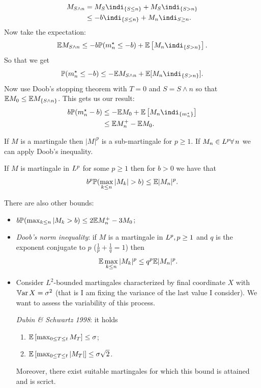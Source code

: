 \documentclass{report}
\begin{document}
\begin{fancyproof}
	\begin{align*}
		M_{S\wedge n}&=M_{S}\indi_{\{S\leq n\}}+M_{S}\indi_{\{S>n\}}\\
		&\leq-b\indi_{\{S\leq n\}}+M_{n}\indi_{S\geq n}.
	\end{align*}
	Now take the expectation:
	\begin{equation*}
		\ev M_{S\wedge n}\leq-b\pr(m^{\star}_{n}\leq-b)+\ev\left[M_{n}\indi_{\{S>n\}}\right].
	\end{equation*}
	So that we get
	\begin{equation*}
		\pr(m^{\star}_{n}\leq-b)\leq-\ev M_{S\wedge n}+\ev[M_{n}\indi_{\{S>n\}}].
	\end{equation*}
	Now use Doob's stopping theorem with $T=0$ and $S=S\wedge n$ so that $\mathbb{E} M_{0}\leq\mathbb{E} M_{\{S\wedge n\}}$. This gets us our result:
	\begin{align*}
		b\pr(m^{\star}_{n}-b)&\leq-\ev M_{0}+\ev\left[M_{n}\indi_{\{m_{n}^{\star}\}}\right]\\
		&\leq\ev M^{+}_{n}-\ev M_{0}.
	\end{align*}
\end{fancyproof}
\begin{remark}
	If $M$ is a martingale then $|M|^{p}$ is a sub-martingale for $p\geq1$. If $M_{n}\in L^{p}\forall\, n$ we can apply Doob's inequality.
\end{remark}
\begin{corollary}
	If $M$ is martingale in $L^{p}$ for some $p\geq 1$ then for $b>0$ we have that
	\begin{equation*}
		b^{p}\pr(\max_{k\leq n}|M_{k}|>b)\leq\ev|M_{n}|^{p}.
	\end{equation*}
\end{corollary}
There are also other bounds:
\begin{itemize}
	\item $b\mathbb{P}(\max_{k\leq n}|M_{k}>b)\leq 2\mathbb{E} M_{n}^{+}-3M_{0}$;
	\item \emph{Doob's norm inequality}: if $M$ is a martingale in $L^{p},p\geq 1$ and $q$ is the exponent conjugate to $p$ ($\frac{1}{p}+\frac{1}{q}=1$) then
	\begin{equation*}
		\mathbb{E}\max_{  k\leq n}|M_{k}|^{p}\leq q^{p}\mathbb{E}|M_{n}|^{p}.
	\end{equation*}
	\item  Consider $L^{2}$-bounded martingales characterized by final coordinate $X$ with $\mathbb{V}\mathrm{ar}\, X=\sigma^{2}$ (that is I am fixing the variance of the last value I consider). We want to assess the variability of this process.
	\begin{theorem}
		\emph{Dubin \& Schwartz 1998}: it holds
		\begin{enumerate}
			\item $\mathbb{E}\left[\max_{0\leq T\leq t}M_{T}\right]\leq\sigma$;
			\item $\mathbb{E}\left[\max_{0\leq T\leq t}|M_{T}|\right]\leq\sigma\sqrt{2}$.
		\end{enumerate}
		Moreover, there exist suitable martingales for which this bound is attained and is scrict.
	\end{theorem}
\end{itemize}
\end{document}
